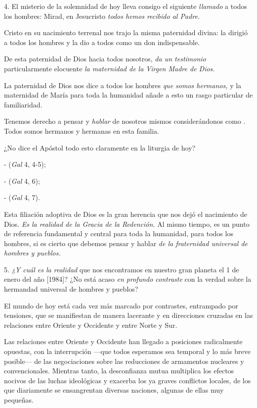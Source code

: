 \begin{body}
	4. El misterio de la solemnidad de hoy lleva consigo el siguiente \emph{llamado} a todos los hombres: Mirad, en Jesucristo \emph{todos 	hemos recibido al Padre.}

	Cristo en su nacimiento terrenal nos trajo la misma paternidad divina: la dirigió a todos los hombres y la dio a todos como un don indispensable.

	De esta paternidad de Dios hacia todos nosotros, \emph{da un testimonio} particularmente elocuente \emph{la maternidad de la Virgen Madre de 	Dios.}

	La paternidad de Dios nos dice a todos los hombres \emph{que somos 	hermanos,} y la maternidad de María para toda la humanidad añade a esto un rasgo particular de familiaridad.

	Tenemos derecho a pensar y \emph{hablar} de nosotros mismos considerándonos como . Todos somos hermanos y hermanas en esta familia.

	¿No dice el Apóstol todo esto claramente en la liturgia de hoy?

	-  (\emph{Gal} 4, 4-5);

	-  (\emph{Gal} 4, 6);

	-  (\emph{Gal} 4, 7).

	Esta filiación adoptiva de Dios es la gran herencia que nos dejó el nacimiento de Dios. \emph{Es la realidad de la Gracia de la Redención.} Al mismo tiempo, es un punto de referencia fundamental y central para toda la humanidad, para todos los hombres, si es cierto que debemos pensar y hablar \emph{de la fraternidad universal de hombres y pueblos.}

	5. \emph{¿Y cuál es la realidad} que nos encontramos en nuestro gran planeta el 1 de enero del año {[}1984{]}? ¿No está acaso \emph{en 	profundo contraste} con la verdad sobre la hermandad universal de hombres y pueblos?

	El mundo de hoy está cada vez más marcado por contrastes, entrampado por tensiones, que se manifiestan de manera lacerante y en direcciones cruzadas en las relaciones entre Oriente y Occidente y entre Norte y Sur.

	Las relaciones entre Oriente y Occidente han llegado a posiciones radicalmente opuestas, con la interrupción ---que todos esperamos sea temporal y lo más breve posible--- de las negociaciones sobre las reducciones de armamentos nucleares y convencionales. Mientras tanto, la desconfianza mutua multiplica los efectos nocivos de las luchas ideológicas y exacerba los ya graves conflictos locales, de los que diariamente se ensangrentan diversas naciones, algunas de ellas muy pequeñas.


\end{body}
